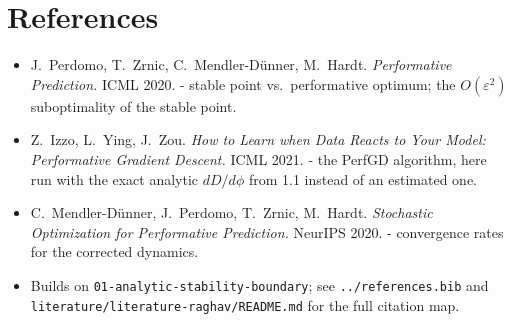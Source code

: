 \documentclass[11pt]{article}
\newcommand{\eps}{\varepsilon}
\newcommand{\code}[1]{\texttt{#1}}
\begin{document}
\section*{References}
\begin{itemize}[leftmargin=*]
\item J.\ Perdomo, T.\ Zrnic, C.\ Mendler-D\"unner, M.\ Hardt.
  \emph{Performative Prediction.} ICML 2020. - stable point vs.\ performative
  optimum; the $O(\eps^2)$ suboptimality of the stable point.
\item Z.\ Izzo, L.\ Ying, J.\ Zou. \emph{How to Learn when Data Reacts to Your
  Model: Performative Gradient Descent.} ICML 2021. - the PerfGD algorithm, here
  run with the exact analytic $dD/d\phi$ from 1.1 instead of an estimated one.
\item C.\ Mendler-D\"unner, J.\ Perdomo, T.\ Zrnic, M.\ Hardt. \emph{Stochastic
  Optimization for Performative Prediction.} NeurIPS 2020. - convergence rates
  for the corrected dynamics.
\item Builds on \code{01-analytic-stability-boundary}; see \code{../references.bib}
  and \code{literature/literature-raghav/README.md} for the full citation map.
\end{itemize}
\end{document}

